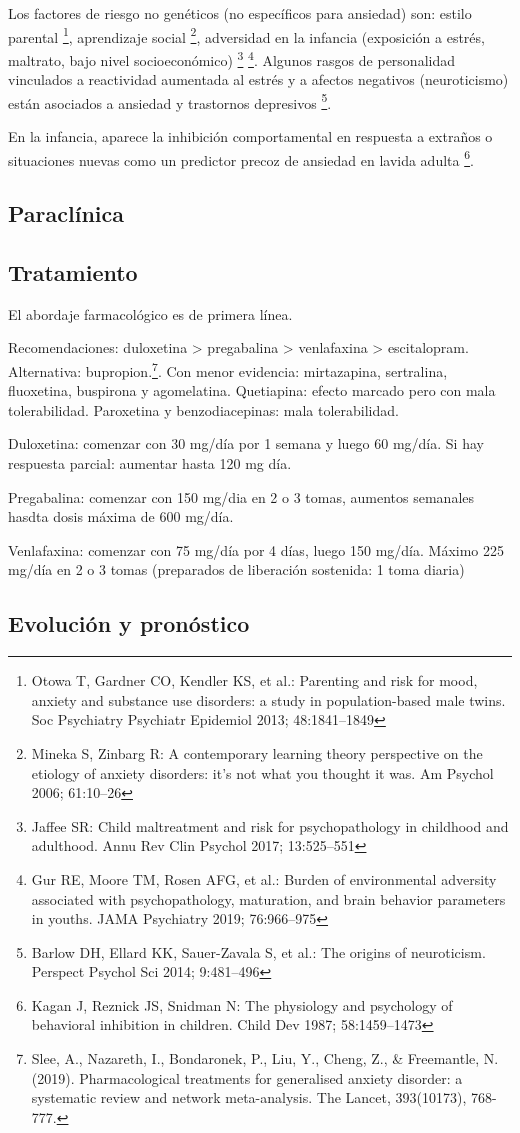 Los factores de riesgo no genéticos (no específicos para ansiedad) son: estilo parental \footnote{Otowa T, Gardner CO, Kendler KS, et al.: Parenting and risk for mood, anxiety and substance use disorders: a study in population-based male twins. Soc Psychiatry Psychiatr Epidemiol 2013; 48:1841–1849}, aprendizaje social \footnote{Mineka S, Zinbarg R: A contemporary learning theory perspective on the etiology of anxiety disorders: it’s not what you thought it was. Am Psychol 2006; 61:10–26}, adversidad en la infancia (exposición a estrés, maltrato, bajo nivel socioeconómico) \footnote{Jaffee SR: Child maltreatment and risk for psychopathology in childhood and adulthood. Annu Rev Clin Psychol 2017; 13:525–551} \footnote{Gur RE, Moore TM, Rosen AFG, et al.: Burden of environmental adversity associated with psychopathology, maturation, and brain behavior parameters in youths. JAMA Psychiatry 2019; 76:966–975}. Algunos rasgos de personalidad vinculados a reactividad aumentada al estrés y a afectos negativos (neuroticismo) están asociados a ansiedad y trastornos depresivos \footnote{Barlow DH, Ellard KK, Sauer-Zavala S, et al.: The origins of neuroticism. Perspect Psychol Sci 2014; 9:481–496}.

En la infancia, aparece la inhibición comportamental en respuesta a extraños o situaciones nuevas como un predictor precoz de ansiedad en lavida adulta \footnote{Kagan J, Reznick JS, Snidman N: The physiology and psychology of behavioral inhibition in children. Child Dev 1987; 58:1459–1473}.
\subsection*{Paraclínica}
\subsection*{Tratamiento}
El abordaje farmacológico es de primera línea.

Recomendaciones: duloxetina > pregabalina > venlafaxina > escitalopram. Alternativa: bupropion.\footnote{Slee, A., Nazareth, I., Bondaronek, P., Liu, Y., Cheng, Z., \& Freemantle, N. (2019). Pharmacological treatments for generalised anxiety disorder: a systematic review and network meta-analysis. The Lancet, 393(10173), 768-777.}. Con menor evidencia: mirtazapina, sertralina, fluoxetina, buspirona y agomelatina. Quetiapina: efecto marcado pero con mala tolerabilidad. Paroxetina y benzodiacepinas: mala tolerabilidad.

Duloxetina: comenzar con 30 mg/día por 1 semana y luego 60 mg/día. Si hay respuesta parcial: aumentar hasta 120 mg día.

Pregabalina: comenzar con 150 mg/dia en 2 o 3 tomas, aumentos semanales hasdta dosis máxima de 600 mg/día.

Venlafaxina: comenzar con 75 mg/día por 4 días, luego 150 mg/día. Máximo 225 mg/día en 2 o 3 tomas (preparados de liberación sostenida: 1 toma diaria)
\subsection*{Evolución y pronóstico}

